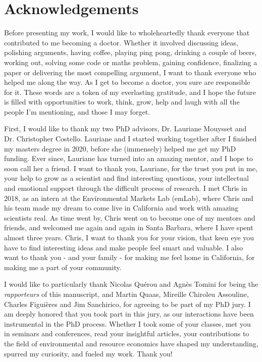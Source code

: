 \chapter*{Acknowledgements}
\onehalfspacing

Before presenting my work, I would like to wholeheartedly thank everyone that contributed to me becoming a doctor. Whether it involved discussing ideas, polishing arguments, having coffee, playing ping pong, drinking a couple of beers, working out, solving some code or maths problem, gaining confidence, finalizing a paper or delivering the most compelling argument, I want to thank everyone who helped me along the way. As I get to become a doctor, you sure are responsible for it. These words are a token of my everlasting gratitude, and I hope the future is filled with opportunities to work, think, grow, help and laugh with all the people I'm mentioning, and those I may forget. 

First, I would like to thank my two PhD advisors, Dr. Lauriane Mouysset and Dr. Christopher Costello. Lauriane and I started working together after I finished my masters degree in 2020, before she (immensely) helped me get my PhD funding. Ever since, Lauriane has turned into an amazing mentor, and I hope to soon call her a friend. I want to thank you, Lauriane, for the trust you put in me, your help to grow as a scientist and find interesting questions, your intellectual and emotional support through the difficult process of research. 
%
I met Chris in 2018, as an intern at the Environmental Markets Lab (emLab), where Chris and his team made my dream to come live in California and work with amazing scientists real. As time went by, Chris went on to become one of my mentors and friends, and welcomed me again and again in Santa Barbara, where I have spent almost three years. Chris, I want to thank you for your vision, that keen eye you have to find interesting ideas and make people feel smart and valuable. I also want to thank you - and your family - for making me feel home in California, for making me a part of your community.

I would like to particularly thank Nicolas Quérou and Agnès Tomini for being the \textit{rapporteurs} of this manuscript, and Martin Quaas, Mireille Chiroleu Assouline, Charles Figuières and Jim Sanchirico, for agreeing to be part of my PhD jury. I am deeply honored that you took part in this jury, as our interactions have been instrumental in the PhD process. Whether I took some of your classes, met you in seminars and conferences, read your insightful articles, your contributions to the field of environmental and resource economics have shaped my understanding, spurred my curiosity, and fueled my work. Thank you!


